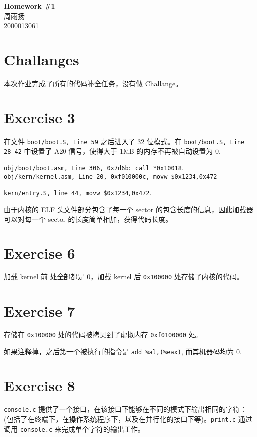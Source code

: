 \documentclass[11pt]{article}
\newcommand{\hwid}{1}			%
\newcommand{\name}{周雨扬} 		%
\newcommand{\id}{2000013061} 	%
\begin{document}
    \pagestyle{fancy}
    \chead{}

    \begin{center}
        {\LARGE \bf Homework \#\hwid}\\
        {\Large \name}\\
        {\Large \id}\\
    \end{center}

	\section{Challanges}
		\par 本次作业完成了所有的代码补全任务，没有做 Challange。
		
	\section{Exercise 3}
		\par 在文件 \texttt{boot/boot.S, Line 59} 之后进入了 32 位模式。在 \texttt{boot/boot.S, Line 28~42} 中设置了 A20 信号，使得大于 1MB 的内存不再被自动设置为 0.
		\par \texttt{obj/boot/boot.asm, Line 306,  0x7d6b: call  *0x10018}.
			 \texttt{obj/kern/kernel.asm, Line 20, 0xf010000c, movw   \$0x1234,0x472}
		\par \texttt{kern/entry.S, line 44, movw   \$0x1234,0x472}.
		\par 由于内核的 ELF 头文件部分包含了每一个 sector 的包含长度的信息，因此加载器可以对每一个 sector 的长度简单相加，获得代码长度。
	
	\section{Exercise 6}
		\par 加载 kernel 前  处全部都是 0，加载 kernel 后 \texttt{0x100000} 处存储了内核的代码。
	
	\section{Exercise 7}
		\par 存储在 \texttt{0x100000} 处的代码被拷贝到了虚拟内存 \texttt{0xf0100000} 处。
		\par 如果注释掉，之后第一个被执行的指令是 \texttt{add \%al,(\%eax)}, 而其机器码均为 0.
	
	\section{Exercise 8}
		\par \texttt{console.c} 提供了一个接口，在该接口下能够在不同的模式下输出相同的字符：(包括了在终端下，在操作系统程序下，以及在并行化的接口下等)。\texttt{print.c} 通过调用 \texttt{console.c} 来完成单个字符的输出工作。
		
\end{document}
